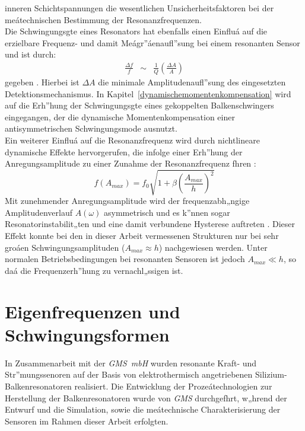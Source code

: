 inneren Schichtspannungen die wesentlichen Unsicherheitsfaktoren bei der
meátechnischen Bestimmung der Resonanzfrequenzen.\\
Die Schwingungsgte eines Resonators hat ebenfalls einen Einfluá auf die
erzielbare Frequenz- und damit Meágr”áenaufl”sung bei einem resonanten
Sensor und ist durch:
\begin{eqnarray}
\label{Qaufl}
 \frac{\Delta f}{f} & \sim & \frac{1}{Q} \left( \frac{\Delta A}{A} \right)
\end{eqnarray}
gegeben \cite{Til93}. Hierbei ist $\Delta A$ die minimale
Amplitudenaufl”sung des eingesetzten Detektionsmechanismus.
In Kapitel~\ref{dynamischemomentenkompensation} wird auf die Erh”hung der
Schwingungsgte eines gekoppelten Balkenschwingers eingegangen, der die
dynamische Momentenkompensation einer antisymmetrischen Schwingungsmode
ausnutzt.\\
Ein weiterer Einfluá auf die Resonanzfrequenz wird durch nichtlineare
dynamische Effekte hervorgerufen, die infolge einer Erh”hung der
Anregungsamplitude zu einer Zunahme der Resonanzfrequenz fhren \cite{Eis64}:
\begin{equation}
\label{nlampli}
 f(A_{max}) = f_{0} \sqrt{1 + \beta \left( \frac{A_{max}}{h} \right)^2 }
\end{equation}
Mit zunehmender Anregungsamplitude wird der frequenzabh„ngige
Amplitudenverlauf $A(\omega)$ asymmetrisch und es k”nnen sogar
Resonatorinstabilit„ten und eine damit verbundene Hysterese auftreten
\cite{And87, Zoo92}. Dieser Effekt konnte bei den in dieser Arbeit
vermessenen Strukturen nur bei sehr groáen Schwingungsamplituden
($A_{max} \approx h$) nachgewiesen werden. Unter normalen
Betriebsbedingungen bei resonanten Sensoren ist jedoch $A_{max} \ll h$,
so daá die Frequenzerh”hung zu vernachl„ssigen ist.


\newpage
\section{Eigenfrequenzen und Schwingungsformen}
\label{eigenfrequenzenundschwingungsformen}

In Zusammenarbeit mit der {\em GMS~mbH} wurden resonante Kraft- und
Str”mungssenoren auf der Basis von elektrothermisch angetriebenen
Silizium-Balkenresonatoren realisiert. Die Entwicklung der Prozeátechnologien
zur Herstellung der Balkenresonatoren wurde von {\em GMS} durchgefhrt,
w„hrend der Entwurf und die Simulation, sowie die meátechnische
Charakterisierung der Sensoren im Rahmen dieser Arbeit erfolgten.



